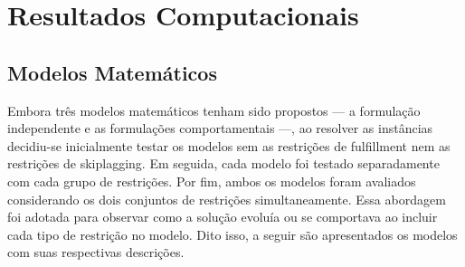 
\chapter{Resultados Computacionais}

\section{Modelos Matemáticos}
Embora três modelos matemáticos tenham sido propostos — a formulação independente e as formulações comportamentais —, ao resolver as instâncias decidiu-se inicialmente testar os modelos sem as restrições de fulfillment nem as restrições de skiplagging. Em seguida, cada modelo foi testado separadamente com cada grupo de restrições. Por fim, ambos os modelos foram avaliados considerando os dois conjuntos de restrições simultaneamente. Essa abordagem foi adotada para observar como a solução evoluía ou se comportava ao incluir cada tipo de restrição no modelo. Dito isso, a seguir são apresentados os modelos com suas respectivas descrições.
\vspace{0.5cm}


